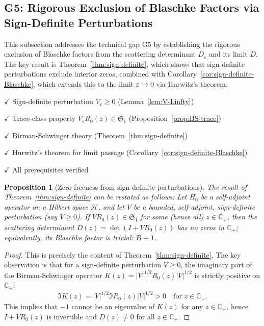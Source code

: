 ﻿\documentclass[12pt,a4paper]{article}
\newtheorem{proposition}[theorem]{Proposition}
\theoremstyle{definition}
\theoremstyle{remark}
\newcommand{\CC}{\mathbb{C}}
\begin{document}
\subsection{G5: Rigorous Exclusion of Blaschke Factors via Sign-Definite Perturbations}
\label{subsec:G5-blaschke-exclusion}

This subsection addresses the technical gap G5 by establishing the rigorous exclusion of Blaschke factors from the scattering determinant $D_\varepsilon$ and its limit $D$. The key result is Theorem~\ref{thm:sign-definite}, which shows that sign-definite perturbations exclude interior zeros, combined with Corollary~\ref{cor:sign-definite-Blaschke}, which extends this to the limit $\varepsilon \to 0$ via Hurwitz's theorem.

\begin{checklist}
\item[$\checkmark$] Sign-definite perturbation $V_\varepsilon \geq 0$ (Lemma~\ref{lem:V-Linfty})
\item[$\checkmark$] Trace-class property $V_\varepsilon R_0(z) \in \mathfrak{S}_1$ (Proposition~\ref{prop:BS-trace})
\item[$\checkmark$] Birman-Schwinger theory (Theorem~\ref{thm:sign-definite})
\item[$\checkmark$] Hurwitz's theorem for limit passage (Corollary~\ref{cor:sign-definite-Blaschke})
\item[$\checkmark$] All prerequisites verified
\end{checklist}

\begin{proposition}[Zero-freeness from sign-definite perturbations]
\label{prop:zero-free-sign-definite}
The result of Theorem~\ref{thm:sign-definite} can be restated as follows: Let $H_0$ be a self-adjoint operator on a Hilbert space $\mathcal{H}$, and let $V$ be a bounded, self-adjoint, sign-definite perturbation (say $V \geq 0$). If $VR_0(z) \in \mathfrak{S}_1$ for some (hence all) $z \in \CC_+$, then the scattering determinant $D(z) = \det(I + VR_0(z))$ has no zeros in $\CC_+$; equivalently, its Blaschke factor is trivial: $B \equiv 1$.
\end{proposition}

\begin{proof}
This is precisely the content of Theorem~\ref{thm:sign-definite}. The key observation is that for a sign-definite perturbation $V \geq 0$, the imaginary part of the Birman-Schwinger operator $K(z) = |V|^{1/2} R_0(z) |V|^{1/2}$ is strictly positive on $\CC_+$:
\[
  \Im K(z) = |V|^{1/2} \Im R_0(z) |V|^{1/2} > 0 \quad \text{for } z \in \CC_+.
\]
This implies that $-1$ cannot be an eigenvalue of $K(z)$ for any $z \in \CC_+$, hence $I + VR_0(z)$ is invertible and $D(z) \neq 0$ for all $z \in \CC_+$.
\end{proof}
\end{document}
